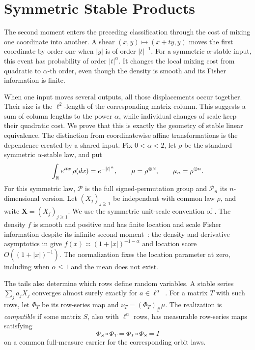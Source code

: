 \section{Symmetric Stable Products}

The second moment enters the preceding classification through the cost of
mixing one coordinate into another. A shear \((x,y)\mapsto(x+ty,y)\) moves
the first coordinate by order one when \(|y|\) is of order \(|t|^{-1}\).
For a symmetric \(\alpha\)-stable input, this event has probability of order
\(|t|^\alpha\). It changes the local mixing cost from quadratic to
\(\alpha\)-th order, even though the density is smooth and its Fisher
information is finite.

When one input moves several outputs, all those displacements occur
together. Their size is the \(\ell^2\)-length of the corresponding matrix
column. This suggests a sum of column lengths to the power \(\alpha\),
while individual changes of scale keep their quadratic cost. We prove that
this is exactly the geometry of stable linear equivalence. The distinction
from coordinatewise affine transformations
\cite{marques1991dichotomies,lie2018cauchy,okamura2020cauchy} is the dependence
created by a shared input.
Fix \(0<\alpha<2\), let \(\rho\) be the standard symmetric
\(\alpha\)-stable law, and put
\begin{equation}
 \int_\mathbb R e^{itx}\,\rho(dx)=e^{-|t|^\alpha},
 \qquad
 \mu=\rho^{\otimes\mathbb N},
 \qquad
 \mu_n=\rho^{\otimes n}.
 \label{eq:standard-symmetric-stable-law}
\end{equation}
For this symmetric law, \(\mathcal P\) is the full signed-permutation group and
\(\mathcal P_n\) its \(n\)-dimensional version.
Let \((X_j)_{j\geq1}\) be independent with common law \(\rho\), and
write \(\mathbf X=(X_j)_{j\geq1}\).
We use the symmetric unit-scale convention of
\cite{nolan2020univariate}.  The density \(f\) is smooth and positive and
has finite location and scale Fisher information despite its infinite second
moment~\cite{bobkov2014stable}: the density and derivative asymptotics in
\cite{zolotarev1986stable} give
\(f(x)\asymp(1+|x|)^{-1-\alpha}\) and location score
\(O((1+|x|)^{-1})\).
The normalization fixes the location parameter at zero, including when
\(\alpha\le1\) and the mean does not exist.

The tails also determine which rows define random variables. A stable
series \(\sum_ja_jX_j\) converges almost surely exactly for
\(a\in\ell^\alpha\)~\cite{samorodnitsky1994stable}.  For a matrix \(T\) with
such rows, let \(\Phi_{T}\) be its row-series map and
\(\nu_{T}=(\Phi_{T})_\#\mu\).  The realization is
\emph{compatible} if some matrix \(S\), also with \(\ell^\alpha\) rows, has
measurable row-series maps satisfying
\[
 \Phi_{S}\circ\Phi_{T}
 =\Phi_{T}\circ\Phi_{S}=I
\]
on a common full-measure carrier for the corresponding orbit laws.

